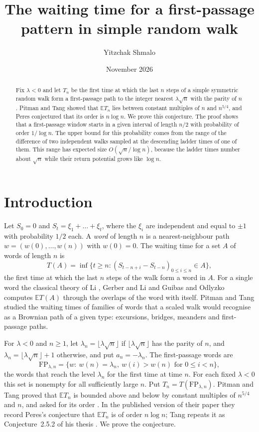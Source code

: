\documentclass[11pt]{amsart}
\title[Waiting for a first-passage pattern]{The waiting time for a first-passage pattern in simple random walk}
\author{Yitzchak Shmalo}
\date{November 2026}
\theoremstyle{remark}
\numberwithin{equation}{section}
\newcommand{\EE}{\mathbb{E}}
\newcommand{\FP}{\mathrm{FP}}
\begin{document}
\begin{abstract}
Fix $\lambda<0$ and let $T_n$ be the first time at which the last $n$ steps of a simple symmetric random walk form a first-passage path to the integer nearest $\lambda\sqrt n$ with the parity of $n$. Pitman and Tang showed that $\EE T_n$ lies between constant multiples of $n$ and $n^{5/4}$, and Peres conjectured that its order is $n\log n$. We prove this conjecture. The proof shows that a first-passage window starts in a given interval of length $n/2$ with probability of order $1/\log n$. The upper bound for this probability comes from the range of the difference of two independent walks sampled at the descending ladder times of one of them. This range has expected size $O(\sqrt n/\log n)$, because the ladder times number about $\sqrt n$ while their return potential grows like $\log n$.
\end{abstract}
\maketitle

\section{Introduction}\label{sec:intro}

Let $S_0=0$ and $S_t=\xi_1+\dots+\xi_t$, where the $\xi_i$ are independent and equal to $\pm1$ with probability $1/2$ each. A \emph{word} of length $n$ is a nearest-neighbour path $w=(w(0),\dots,w(n))$ with $w(0)=0$. The waiting time for a set $A$ of words of length $n$ is
\[
T(A)=\inf\bigl\{t\ge n:(S_{t-n+i}-S_{t-n})_{0\le i\le n}\in A\bigr\},
\]
the first time at which the last $n$ steps of the walk form a word in $A$. For a single word the classical theory of Li \cite{Li}, Gerber and Li \cite{GL} and Guibas and Odlyzko \cite{GO} computes $\EE T(A)$ through the overlaps of the word with itself. Pitman and Tang \cite{PT} studied the waiting times of families of words that a scaled walk would recognise as a Brownian path of a given type: excursions, bridges, meanders and first-passage paths.

For $\lambda<0$ and $n\ge1$, let $\lambda_n=\lfloor\lambda\sqrt n\rfloor$ if $\lfloor\lambda\sqrt n\rfloor$ has the parity of $n$, and $\lambda_n=\lfloor\lambda\sqrt n\rfloor+1$ otherwise, and put $a_n=-\lambda_n$. The first-passage words are
\[
\FP_{\lambda,n}=\bigl\{w:\ w(n)=\lambda_n,\ w(i)>w(n)\text{ for }0\le i<n\bigr\},
\]
the words that reach the level $\lambda_n$ for the first time at time $n$. For each fixed $\lambda<0$ this set is nonempty for all sufficiently large $n$. Put $T_n=T(\FP_{\lambda,n})$. Pitman and Tang \cite[Theorem~1.8]{PT} proved that $\EE T_n$ is bounded above and below by constant multiples of $n^{5/4}$ and $n$, and asked for its order \cite[Question~1.7]{PT}. In the published version of their paper \cite[Conjecture~1]{PTpub} they record Peres's conjecture that $\EE T_n$ is of order $n\log n$; Tang repeats it as Conjecture~2.5.2 of his thesis \cite{Tang}. We prove the conjecture.
\end{document}
